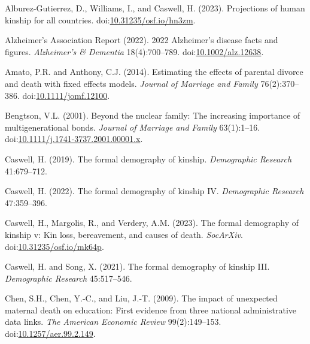 \documentclass[
  11pt,
  letterpaper,
]{article}
\newlength{\cslhangindent}
\newlength{\cslentryspacingunit} %
\newenvironment{CSLReferences}[2] %
 {%
  \setlength{\parindent}{0pt}
  \ifodd #1
  \let\oldpar\par
  \def\par{\hangindent=\cslhangindent\oldpar}
  \fi
  \setlength{\parskip}{#2\cslentryspacingunit}
 }%
 {}
\begin{document}
\hypertarget{refs}{}
\begin{CSLReferences}{1}{0}
\leavevmode{}%
Alburez-Gutierrez, D., Williams, I., and Caswell, H. (2023). Projections of human kinship for all countries. doi:\href{https://doi.org/10.31235/osf.io/hn3zm}{10.31235/osf.io/hn3zm}.

\leavevmode{}%
Alzheimer's Association Report (2022). 2022 {A}lzheimer's disease facts and figures. \emph{{A}lzheimer's \& Dementia} 18(4):700--789. doi:\href{https://doi.org/10.1002/alz.12638}{10.1002/alz.12638}.

\leavevmode{}%
Amato, P.R. and Anthony, C.J. (2014). Estimating the effects of parental divorce and death with fixed effects models. \emph{Journal of Marriage and Family} 76(2):370--386. doi:\href{https://doi.org/10.1111/jomf.12100}{10.1111/jomf.12100}.

\leavevmode{}%
Bengtson, V.L. (2001). Beyond the nuclear family: The increasing importance of multigenerational bonds. \emph{Journal of Marriage and Family} 63(1):1--16. doi:\href{https://doi.org/10.1111/j.1741-3737.2001.00001.x}{10.1111/j.1741-3737.2001.00001.x}.

\leavevmode{}%
Caswell, H. (2019). The formal demography of kinship. \emph{Demographic Research} 41:679--712.

\leavevmode{}%
Caswell, H. (2022). The formal demography of kinship IV. \emph{Demographic Research} 47:359--396.

\leavevmode{}%
Caswell, H., Margolis, R., and Verdery, A.M. (2023). The formal demography of kinship v: Kin loss, bereavement, and causes of death. \emph{SocArXiv}. doi:\href{https://doi.org/10.31235/osf.io/mk64p}{10.31235/osf.io/mk64p}.

\leavevmode{}%
Caswell, H. and Song, X. (2021). The formal demography of kinship III. \emph{Demographic Research} 45:517--546.

\leavevmode{}%
Chen, S.H., Chen, Y.-C., and Liu, J.-T. (2009). The impact of unexpected maternal death on education: First evidence from three national administrative data links. \emph{The American Economic Review} 99(2):149--153. doi:\href{https://doi.org/10.1257/aer.99.2.149}{10.1257/aer.99.2.149}.


\end{CSLReferences}
\end{document}
